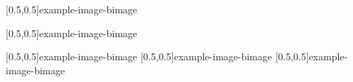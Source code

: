 



\graphicspath{{Figures/}{Figures/Iceland}}


\subtitle{Day 2}
\date{08.10.2019}


    
    
    [0.5,0.5]{example-image-b}{image}
    
    [0.5,0.5]{example-image-b}{image}
    
    [0.5,0.5]{example-image-b}{image}
%     
    [0.5,0.5]{example-image-b}{image}
%     
    [0.5,0.5]{example-image-b}{image}
%     

